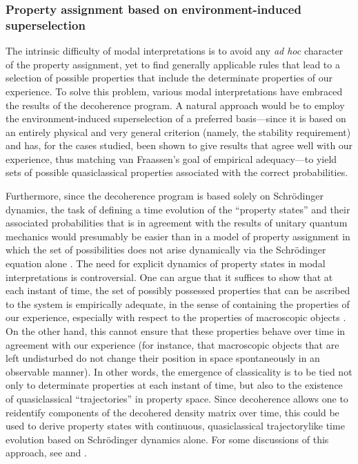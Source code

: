 \documentclass[rmp,aps,amsmath,amsfonts,noshowkeys,noshowpacs,12pt]{revtex4}
\begin{document}
\subsubsection{Property assignment based on environment-induced superselection}

The intrinsic difficulty of modal interpretations is to avoid any
\emph{ad hoc} character of the property assignment, yet to find
generally applicable rules that lead to a selection of possible
properties that include the determinate properties of our experience.
To solve this problem, various modal interpretations have embraced the
results of the decoherence program. A natural approach would be to
employ the environment-induced superselection of a preferred
basis---since it is based on an entirely physical and very general
criterion (namely, the stability requirement) and has, for the cases
studied, been shown to give results that agree well with our
experience, thus matching van Fraassen's goal of empirical
adequacy---to yield sets of possible quasiclassical properties
associated with the correct probabilities.

Furthermore, since the decoherence program is based solely on
Schr\"odinger dynamics, the task of defining a time evolution of the
``property states'' and their associated probabilities that is in
agreement with the results of unitary quantum mechanics would
presumably be easier than in a model of property assignment in which
the set of possibilities does not arise dynamically via the
Schr\"odinger equation alone \citep[for a detailed proposal for modal
dynamics of the latter type, see][]{Bacciagaluppi:1999:iz}. The need
for explicit dynamics of property states in modal interpretations is
controversial.  One can argue that it suffices to show that at each
instant of time, the set of possibly possessed properties that can be
ascribed to the system is empirically adequate, in the sense of
containing the properties of our experience, especially with respect
to the properties of macroscopic objects \citep[this is essentially
the view of, for example,][]{Fraassen:1973:yb,Fraassen:1991:ys}.  On
the other hand, this cannot ensure that these properties behave over
time in agreement with our experience (for instance, that macroscopic
objects that are left undisturbed do not change their position in
space spontaneously in an observable manner). In other words, the
emergence of classicality is to be tied not only to determinate
properties at each instant of time, but also to the existence of
quasiclassical ``trajectories'' in property space.  Since decoherence
allows one to reidentify components of the decohered density matrix
over time, this could be used to derive property states with
continuous, quasiclassical trajectorylike time evolution based on
Schr\"odinger dynamics alone. For some discussions of this approach,
see \citet{Hemmo:1996:fz} and \citet{Bacciagaluppi:1999:iz}.
\end{document}
